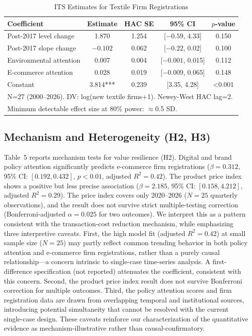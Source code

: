 \documentclass[sustainability,article,submit,moreauthors,pdftex]{mdpi}
\begin{document}
\begin{table}[htbp]
\centering
\caption{ITS Estimates for Textile Firm Registrations}
\label{tab:its}
{\small\setlength{\tabcolsep}{4pt}
\begin{tabular}{l c c c c}
\toprule
Coefficient & Estimate & HAC SE & 95\% CI & $p$-value \\
\midrule
Post-2017 level change & 1.870 & 1.254 & [$-0.59$, 4.33] & 0.150 \\
Post-2017 slope change & $-0.102$ & 0.062 & [$-0.22$, 0.02] & 0.100 \\
Environmental attention & 0.007 & 0.004 & [$-0.001$, 0.015] & 0.112 \\
E-commerce attention & 0.028 & 0.019 & [$-0.009$, 0.065] & 0.148 \\
Constant & 3.814*** & 0.239 & [3.35, 4.28] & <0.001 \\
\midrule
\multicolumn{5}{l}{N=27 (2000--2026). DV: log(new textile firms+1). Newey-West HAC lag=2.} \\
\multicolumn{5}{l}{Minimum detectable effect size at 80\% power: $\approx$0.5 SD.} \\
\bottomrule
\end{tabular}}
\end{table}

\subsection{Mechanism and Heterogeneity (H2, H3)}
Table~5 reports mechanism tests for value resilience (H2). Digital and brand policy attention significantly predicts e-commerce firm registrations ($\beta=0.312$, 95\% CI: $[0.192, 0.432]$, $p<0.01$, adjusted $R^2=0.42$). The product price index shows a positive but less precise association ($\beta=2.185$, 95\% CI: $[0.158, 4.212]$, adjusted $R^2=0.29$). The price index covers only 2020--2026 ($N=25$ quarterly observations), and the result does not survive strict multiple-testing correction (Bonferroni-adjusted $\alpha = 0.025$ for two outcomes). We interpret this as a pattern consistent with the transaction-cost reduction mechanism, while emphasizing three interpretive caveats. First, the high model fit (adjusted $R^2=0.42$) at small sample size ($N=25$) may partly reflect common trending behavior in both policy attention and e-commerce firm registrations, rather than a purely causal relationship---a concern intrinsic to single-case time-series analysis. A first-difference specification (not reported) attenuates the coefficient, consistent with this concern. Second, the product price index result does not survive Bonferroni correction for multiple outcomes. Third, the policy attention scores and firm registration data are drawn from overlapping temporal and institutional sources, introducing potential simultaneity that cannot be resolved with the current single-case design. These caveats reinforce our characterization of the quantitative evidence as mechanism-illustrative rather than causal-confirmatory.
\end{document}
